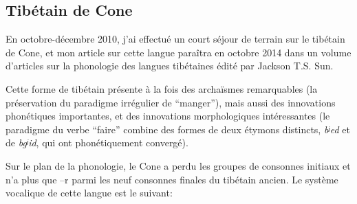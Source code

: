 \documentclass[oldfontcommands,oneside,a4paper,11pt]{memoir}
\begin{document}
\subsection{Tibétain de Cone}

En octobre-décembre 2010, j'ai effectué un court séjour de terrain sur le tibétain de Cone, et mon article sur cette langue paraîtra en octobre 2014 dans un volume d'articles sur la phonologie des langues tibétaines édité par Jackson T.S. Sun.

Cette forme de tibétain présente à la fois des archaïsmes remarquables (la préservation du paradigme irrégulier de ``manger''), mais aussi des innovations phonétiques importantes, et des innovations morphologiques intéressantes (le paradigme du verbe ``faire'' combine des formes de deux étymons distincts, \textit{bʲed} et de \textit{bgʲid}, qui ont phonétiquement convergé).

Sur le plan de la phonologie, le Cone a perdu les groupes de consonnes initiaux et n'a plus que --r parmi les neuf consonnes finales du tibétain ancien. Le système vocalique de cette langue est le suivant:
\end{document}
